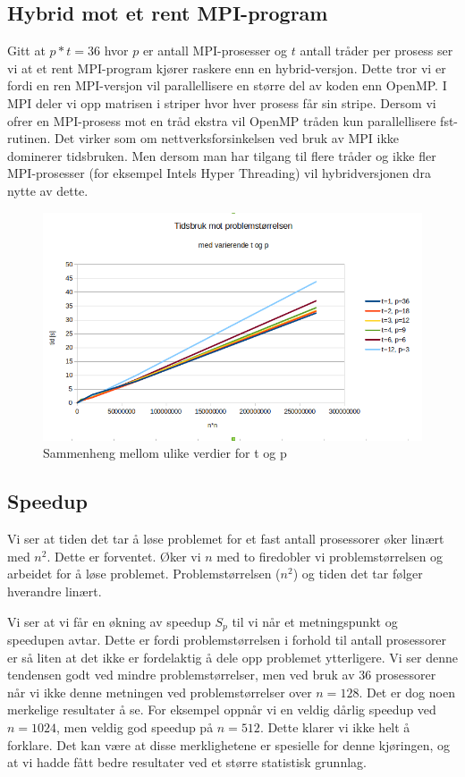 \documentclass[11pt,norsk,a4paper]{article}
\begin{document}
\subsection{Hybrid mot et rent MPI-program}

Gitt at $p*t=36$ hvor $p$ er antall MPI-prosesser og $t$ antall tråder per prosess ser vi at et rent MPI-program kjører raskere enn en hybrid-versjon. Dette tror vi er fordi en ren MPI-versjon vil parallellisere en større del av koden enn OpenMP. I MPI deler vi opp matrisen i striper hvor hver prosess får sin stripe. Dersom vi ofrer en MPI-prosess mot en tråd ekstra vil OpenMP tråden kun parallellisere fst-rutinen. Det virker som om nettverksforsinkelsen ved bruk av MPI ikke dominerer tidsbruken. Men dersom man har tilgang til flere tråder og ikke fler MPI-prosesser (for eksempel Intels Hyper Threading) vil hybridversjonen dra nytte av dette. 

\begin{figure}[h]
\centering
\includegraphics[scale=0.5]{plot_t_p.png}
\caption{Sammenheng mellom ulike verdier for t og p}
\end{figure}

\subsection{Speedup}

Vi ser at tiden det tar å løse problemet for et fast antall prosessorer øker linært med $n^2$. Dette er forventet. Øker vi $n$ med to firedobler vi problemstørrelsen og arbeidet for å løse problemet. Problemstørrelsen ($n^2$) og tiden det tar følger hverandre linært.

Vi ser at vi får en økning av speedup $S_p$ til vi når et metningspunkt og speedupen avtar. Dette er fordi problemstørrelsen i forhold til antall prosessorer er så liten at det ikke er fordelaktig å dele opp problemet ytterligere. Vi ser denne tendensen godt ved mindre problemstørrelser, men ved bruk av 36 prosessorer når vi ikke denne metningen ved problemstørrelser over $n=128$. Det er dog noen merkelige resultater å se. For eksempel oppnår vi en veldig dårlig speedup ved $n=1024$, men veldig god speedup på $n=512$. Dette klarer vi ikke helt å forklare. Det kan være at disse merklighetene er spesielle for denne kjøringen, og at vi hadde fått bedre resultater ved et større statistisk grunnlag.
\end{document}
